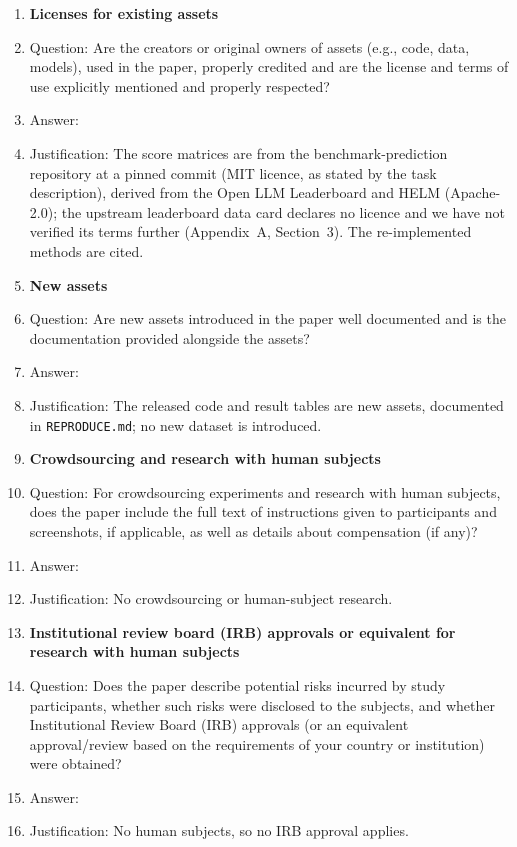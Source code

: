 \begin{enumerate}
\item {\bf Licenses for existing assets}
    \item[] Question: Are the creators or original owners of assets (e.g., code, data, models), used in the paper, properly credited and are the license and terms of use explicitly mentioned and properly respected?
    \item[] Answer: \answerYes{} %
    \item[] Justification: The score matrices are from the benchmark-prediction repository at a pinned commit (MIT licence, as stated by the task description), derived from the Open LLM Leaderboard and HELM (Apache-2.0); the upstream leaderboard data card declares no licence and we have not verified its terms further (Appendix~A, Section~3). The re-implemented methods are cited.

\item {\bf New assets}
    \item[] Question: Are new assets introduced in the paper well documented and is the documentation provided alongside the assets?
    \item[] Answer: \answerYes{} %
    \item[] Justification: The released code and result tables are new assets, documented in \texttt{REPRODUCE.md}; no new dataset is introduced.

\item {\bf Crowdsourcing and research with human subjects}
    \item[] Question: For crowdsourcing experiments and research with human subjects, does the paper include the full text of instructions given to participants and screenshots, if applicable, as well as details about compensation (if any)? 
    \item[] Answer: \answerNA{} %
    \item[] Justification: No crowdsourcing or human-subject research.

\item {\bf Institutional review board (IRB) approvals or equivalent for research with human subjects}
    \item[] Question: Does the paper describe potential risks incurred by study participants, whether such risks were disclosed to the subjects, and whether Institutional Review Board (IRB) approvals (or an equivalent approval/review based on the requirements of your country or institution) were obtained?
    \item[] Answer: \answerNA{} %
    \item[] Justification: No human subjects, so no IRB approval applies.


\end{enumerate}
